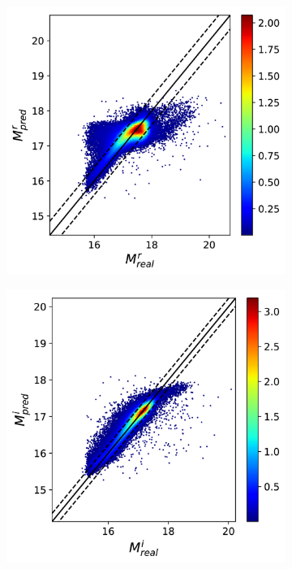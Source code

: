 \documentclass[12pt,letterpaper,twoside,openright]{book}
\begin{document}
\begin{figure}[]
\begin{subfigure}[b]{0.3\textwidth}
    \label{fig:2}
  \end{subfigure}
  \hspace{0cm}
  \begin{subfigure}[b]{0.3\textwidth}
    \includegraphics[width=\textwidth, height = \textwidth]{Figures/pmr3.png}
    \label{fig:2}
    \hspace{0cm}
  \end{subfigure}
  \centering
   \begin{subfigure}[b]{0.3\textwidth}
    \includegraphics[width=\textwidth, height = \textwidth]{Figures/pmi3.png}

\end{subfigure}
\end{figure}
\end{document}

